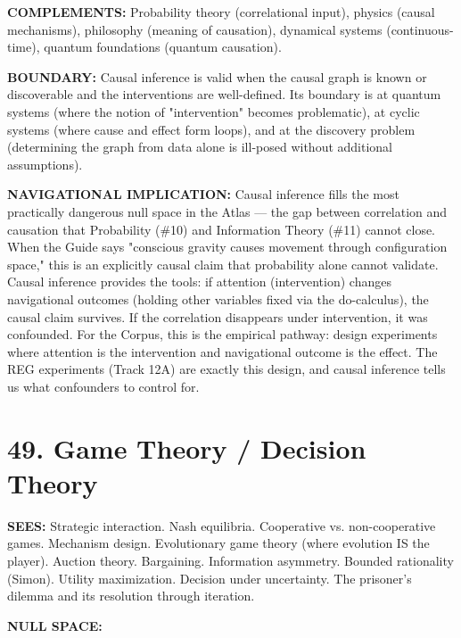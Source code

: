 \textbf{COMPLEMENTS:} Probability theory (correlational input), physics (causal mechanisms), philosophy (meaning of causation), dynamical systems (continuous-time), quantum foundations (quantum causation).


\textbf{BOUNDARY:} Causal inference is valid when the causal graph is known or discoverable and the interventions are well-defined. Its boundary is at quantum systems (where the notion of "intervention" becomes problematic), at cyclic systems (where cause and effect form loops), and at the discovery problem (determining the graph from data alone is ill-posed without additional assumptions).


\textbf{NAVIGATIONAL IMPLICATION:} Causal inference fills the most practically dangerous null space in the Atlas — the gap between correlation and causation that Probability (\#10) and Information Theory (\#11) cannot close. When the Guide says "conscious gravity causes movement through configuration space," this is an explicitly causal claim that probability alone cannot validate. Causal inference provides the tools: if attention (intervention) changes navigational outcomes (holding other variables fixed via the do-calculus), the causal claim survives. If the correlation disappears under intervention, it was confounded. For the Corpus, this is the empirical pathway: design experiments where attention is the intervention and navigational outcome is the effect. The REG experiments (Track 12A) are exactly this design, and causal inference tells us what confounders to control for.


\bigskip\noindent\makebox[\textwidth]{\color{rulegray}\rule{5cm}{0.3pt}}\bigskip


\section*{49. Game Theory / Decision Theory}


\textbf{SEES:} Strategic interaction. Nash equilibria. Cooperative vs. non-cooperative games. Mechanism design. Evolutionary game theory (where evolution IS the player). Auction theory. Bargaining. Information asymmetry. Bounded rationality (Simon). Utility maximization. Decision under uncertainty. The prisoner's dilemma and its resolution through iteration.


\textbf{NULL SPACE:}

